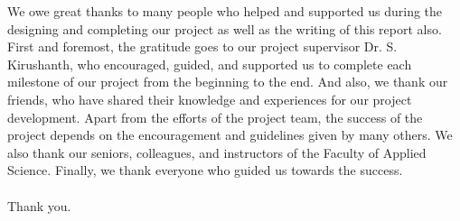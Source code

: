 We owe great thanks to many people who helped and supported us during the designing and completing our project as well as the writing of this report also. First and foremost, the gratitude goes to our project supervisor Dr. S. Kirushanth, who encouraged, guided, and supported us to complete each milestone of our project from the beginning to the end. And also, we thank our friends, who have shared their knowledge and experiences for our project development. Apart from the efforts of the project team, the success of the project depends on the encouragement and guidelines given by many others. We also thank our seniors, colleagues, and instructors of the Faculty of Applied Science. Finally, we thank everyone who guided us towards the success. \\\\ Thank you.
